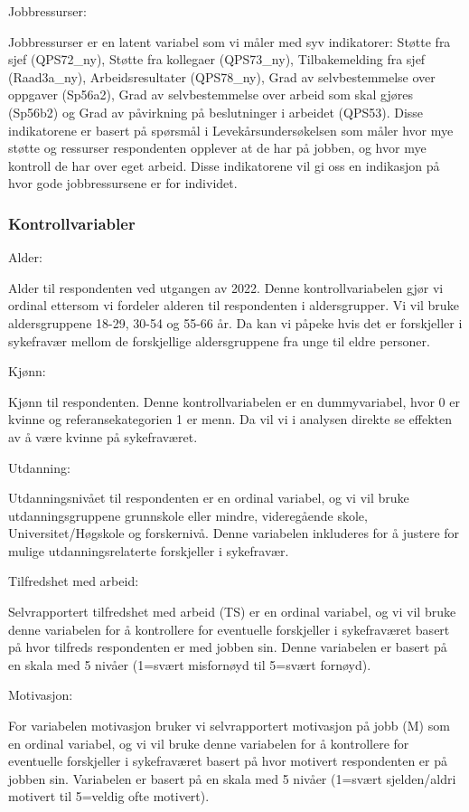 \documentclass[
  12pt,
  a4paper,
  DIV=11,
  numbers=noendperiod]{scrartcl}
\begin{document}
Jobbressurser:

Jobbressurser er en latent variabel som vi måler med syv indikatorer:
Støtte fra sjef (QPS72\_ny), Støtte fra kollegaer (QPS73\_ny),
Tilbakemelding fra sjef (Raad3a\_ny), Arbeidsresultater (QPS78\_ny),
Grad av selvbestemmelse over oppgaver (Sp56a2), Grad av selvbestemmelse
over arbeid som skal gjøres (Sp56b2) og Grad av påvirkning på
beslutninger i arbeidet (QPS53). Disse indikatorene er basert på
spørsmål i Levekårsundersøkelsen som måler hvor mye støtte og ressurser
respondenten opplever at de har på jobben, og hvor mye kontroll de har
over eget arbeid. Disse indikatorene vil gi oss en indikasjon på hvor
gode jobbressursene er for individet.

\subsubsection{Kontrollvariabler}\label{kontrollvariabler}

Alder:

Alder til respondenten ved utgangen av 2022. Denne kontrollvariabelen
gjør vi ordinal ettersom vi fordeler alderen til respondenten i
aldersgrupper. Vi vil bruke aldersgruppene 18-29, 30-54 og 55-66 år. Da
kan vi påpeke hvis det er forskjeller i sykefravær mellom de
forskjellige aldersgruppene fra unge til eldre personer.

Kjønn:

Kjønn til respondenten. Denne kontrollvariabelen er en dummyvariabel,
hvor 0 er kvinne og referansekategorien 1 er menn. Da vil vi i analysen
direkte se effekten av å være kvinne på sykefraværet.

Utdanning:

Utdanningsnivået til respondenten er en ordinal variabel, og vi vil
bruke utdanningsgruppene grunnskole eller mindre, videregående skole,
Universitet/Høgskole og forskernivå. Denne variabelen inkluderes for å
justere for mulige utdanningsrelaterte forskjeller i sykefravær.

Tilfredshet med arbeid:

Selvrapportert tilfredshet med arbeid (TS) er en ordinal variabel, og vi
vil bruke denne variabelen for å kontrollere for eventuelle forskjeller
i sykefraværet basert på hvor tilfreds respondenten er med jobben sin.
Denne variabelen er basert på en skala med 5 nivåer (1=svært misfornøyd
til 5=svært fornøyd).

Motivasjon:

For variabelen motivasjon bruker vi selvrapportert motivasjon på jobb
(M) som en ordinal variabel, og vi vil bruke denne variabelen for å
kontrollere for eventuelle forskjeller i sykefraværet basert på hvor
motivert respondenten er på jobben sin. Variabelen er basert på en skala
med 5 nivåer (1=svært sjelden/aldri motivert til 5=veldig ofte
motivert).
\end{document}
